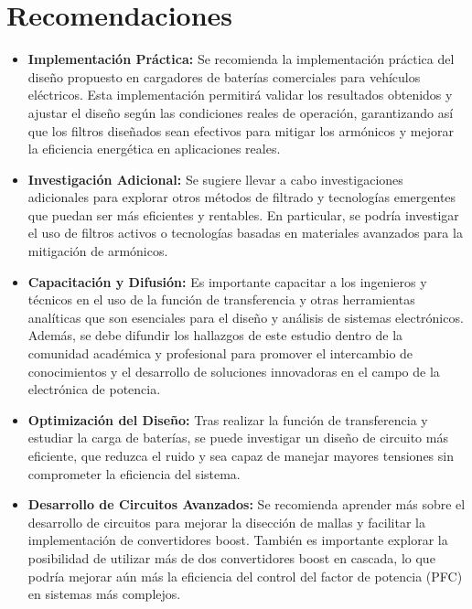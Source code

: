 \section{Recomendaciones}

\begin{itemize}
    \item \textbf{Implementación Práctica:} Se recomienda la implementación práctica del diseño propuesto en cargadores de baterías comerciales para vehículos eléctricos. Esta implementación permitirá validar los resultados obtenidos y ajustar el diseño según las condiciones reales de operación, garantizando así que los filtros diseñados sean efectivos para mitigar los armónicos y mejorar la eficiencia energética en aplicaciones reales.

    \item \textbf{Investigación Adicional:} Se sugiere llevar a cabo investigaciones adicionales para explorar otros métodos de filtrado y tecnologías emergentes que puedan ser más eficientes y rentables. En particular, se podría investigar el uso de filtros activos o tecnologías basadas en materiales avanzados para la mitigación de armónicos.

    \item \textbf{Capacitación y Difusión:} Es importante capacitar a los ingenieros y técnicos en el uso de la función de transferencia y otras herramientas analíticas que son esenciales para el diseño y análisis de sistemas electrónicos. Además, se debe difundir los hallazgos de este estudio dentro de la comunidad académica y profesional para promover el intercambio de conocimientos y el desarrollo de soluciones innovadoras en el campo de la electrónica de potencia.

    \item \textbf{Optimización del Diseño:} Tras realizar la función de transferencia y estudiar la carga de baterías, se puede investigar un diseño de circuito más eficiente, que reduzca el ruido y sea capaz de manejar mayores tensiones sin comprometer la eficiencia del sistema.

    \item \textbf{Desarrollo de Circuitos Avanzados:} Se recomienda aprender más sobre el desarrollo de circuitos para mejorar la disección de mallas y facilitar la implementación de convertidores boost. También es importante explorar la posibilidad de utilizar más de dos convertidores boost en cascada, lo que podría mejorar aún más la eficiencia del control del factor de potencia (PFC) en sistemas más complejos.
\end{itemize}

